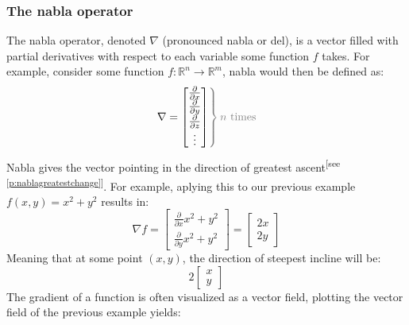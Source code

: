 \documentclass[a4paper,12pt]{article}
\newcommand{\partialder}[2]{\frac{\partial #1}{\partial #2}}        %
\newcommand{\referto}[1]{\textsuperscript{\color{darkgray}\tiny[see \ref{#1}]}}
\begin{document}
\subsubsection*{The nabla operator}
The nabla operator, denoted $\nabla$ (pronounced nabla or del), is a vector filled with partial derivatives with respect to each variable some function $f$ takes. For example, consider some function $f:\mathbb{R}^n\rightarrow\mathbb{R}^m$, nabla would then be defined as:
\begin{equation}
	\left.\nabla=
	\begin{bmatrix}
		\partialder{}{x} \\
		\partialder{}{y} \\
		\partialder{}{z} \\ 
		\vdots 	         \\
	\end{bmatrix}
	\color{gray}\right\} \color{gray}n\text{ times}\color{black}
\end{equation}
Nabla gives the vector pointing in the direction of greatest ascent\referto{p:nablagreatestchange}. For example, aplying this to our previous example $f(x,y)=x^2+y^2$ results in:
$$\nabla f=\begin{bmatrix}
	\partialder{}{x}x^2+y^2\\
	\partialder{}{y}x^2+y^2	
\end{bmatrix}=\begin{bmatrix}
	2x\\
	2y
\end{bmatrix}$$
Meaning that at some point $(x,y)$, the direction of steepest incline will be:$$2{\begin{bmatrix}x\\y\end{bmatrix}}$$
The gradient of a function is often visualized as a vector field, plotting the vector field of the previous example yields:
\end{document}
